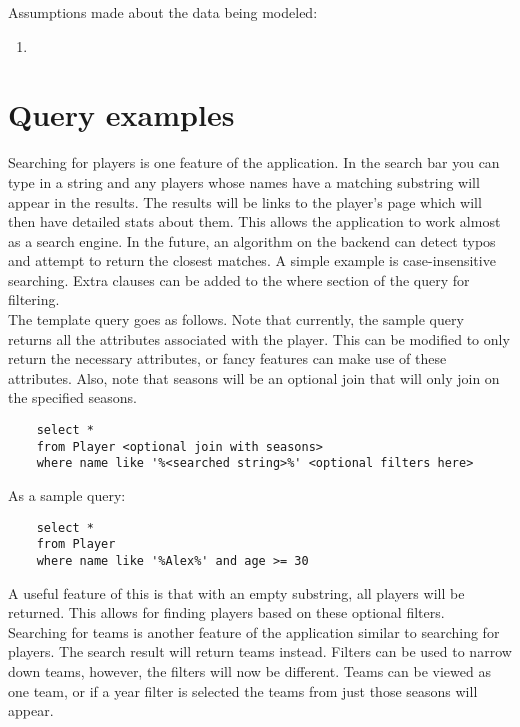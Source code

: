 \documentclass[11pt]{article}
\begin{document}
Assumptions made about the data being modeled:
\begin{enumerate}
    \item 
\end{enumerate}

\section{Query examples}


Searching for players is one feature of the application. In the search bar you can type in a string and any players whose names have a matching substring will appear in the results. The results will be links to the player's page which will then have detailed stats about them. This allows the application to work almost as a search engine. In the future, an algorithm on the backend can detect typos and attempt to return the closest matches. A simple example is case-insensitive searching. Extra clauses can be added to the where section of the query for filtering. \\

The template query goes as follows. Note that currently, the sample query returns all the attributes associated with the player. This can be modified to only return the necessary attributes, or fancy features can make use of these attributes. Also, note that seasons will be an optional join that will only join on the specified seasons.

\begin{verbatim}
    select *
    from Player <optional join with seasons>
    where name like '%<searched string>%' <optional filters here>
\end{verbatim}

As a sample query:
\begin{verbatim}
    select *
    from Player
    where name like '%Alex%' and age >= 30
\end{verbatim}

A useful feature of this is that with an empty substring, all players will be returned. This allows for finding players based on these optional filters. \\


Searching for teams is another feature of the application similar to searching for players. The search result will return teams instead. Filters can be used to narrow down teams, however, the filters will now be different. Teams can be viewed as one team, or if a year filter is selected the teams from just those seasons will appear. \\
\end{document}

